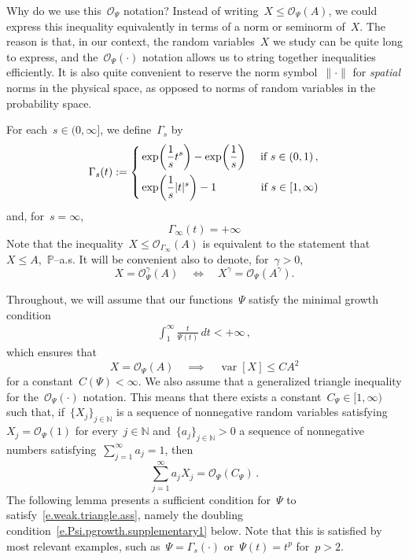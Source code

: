 \documentclass[11pt,twoside]{article} %
\numberwithin{equation}{section}
\theoremstyle{definition}
\let\originalleft\left
\let\originalright\right
\renewcommand{\left}{\mathopen{}\mathclose\bgroup\originalleft}
\renewcommand{\right}{\aftergroup\egroup\originalright}
\newcommand*{\N}{\ensuremath{\mathbb{N}}}
\renewcommand{\P}{\mathbb{P}}
\renewcommand{\O}{\mathcal{O}}
\DeclareMathOperator{\var}{var}
\begin{document}
\smallskip

Why do we use this~$\O_\Psi$ notation? Instead of writing~$X \leq \O_\Psi(A)$, we could express this inequality equivalently in terms of a norm or seminorm of~$X$. The reason is that, in our context, the random variables~$X$ we study can be quite long to express, and the~$\O_\Psi(\cdot)$ notation allows us to string together inequalities efficiently. It is also quite convenient to reserve the norm symbol~$\| \cdot \|$ for \emph{spatial} norms in the physical space, as opposed to norms of random variables in the probability space. 

\smallskip

For each~$s\in (0,\infty]$, we define~$\Gamma_s$ by 
\begin{equation}
\label{e.Gamma.s.geq1}
\Gamma_s(t) := 
\left\{
\begin{aligned}
& \exp\biggl( \frac1s t ^s \biggr) - \exp\biggl( \frac1s \biggr) & \ \mbox{if} \ s \in (0,1)\,, \\
& \exp\biggl( \frac1s |t|^s \biggr) - 1 & \ \mbox{if} \ s \in [1,\infty)
\end{aligned}
\right.
\end{equation}
and, for~$s=\infty$, 
\begin{equation}
\label{e.Gamma.infty}
\Gamma_\infty(t) = 
+\infty 
\end{equation}
Note that the inequality~$X \leq \O_{\Gamma_\infty}(A)$ is equivalent to the statement that~$X \leq A$,~$\P$--a.s. 
It will be convenient also to denote, for~$\gamma>0$, 
\begin{equation*}
X = \O_\Psi^\gamma(A) 
\quad \iff \quad
X^\gamma = \O_\Psi (A^\gamma). 
\end{equation*}

\smallskip

Throughout, we will assume that our functions~$\Psi$ satisfy the minimal growth condition
\begin{align}
\label{e.Young.growth}
\int_{1}^\infty 
\frac{t}{ \Psi(t)} \,dt < +\infty \,,
\end{align}
which ensures that
\begin{equation*}
X = \O_{\Psi}(A) 
\quad \implies \quad 
\var[X] \leq C A^2
\end{equation*}
for a constant~$C(\Psi)<\infty$. 
We also assume that a generalized triangle inequality for the~$\O_\Psi(\cdot)$ notation. This means that there exists a constant~$C_{\Psi} \in [1,\infty)$ such that, if~$\{ X_j \}_{j\in\N}$ is a sequence of nonnegative random variables satisfying~$X_j = \O_{\Psi}(1)$ for every~$j \in \N$ and~$\{ a_j\}_{j \in \N}>0$ a sequence of nonnegative numbers satisfying~$\sum_{j=1}^\infty a_j =1$, then
\begin{equation} 
\label{e.weak.triangle.ass}
\sum_{j =1}^\infty a_j X_j = \O_{\Psi}(C_{\Psi}) \,.
\end{equation}  
The following lemma presents a sufficient condition for~$\Psi$ to satisfy~\eqref{e.weak.triangle.ass}, namely the doubling condition~\eqref{e.Psi.pgrowth.supplementary1} below. Note that this is satisfied by most relevant examples, such as~$\Psi = \Gamma_s(\cdot)$ or~$\Psi(t) = t^p$ for~$p>2$. 
\end{document}
